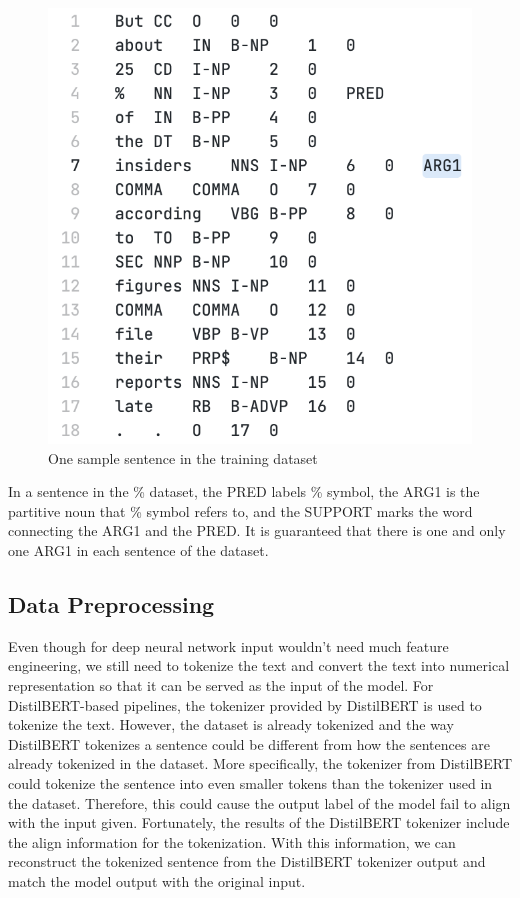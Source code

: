 \documentclass[11pt]{article}
\begin{document}
\begin{figure}[h]
  \centering
  \includegraphics[width=\linewidth]{assets/dataset-one-sample.png}
  \caption{One sample sentence in the training dataset}
  \label{fig:dataset-one-sample}
\end{figure}

In a sentence in the \% dataset, the PRED labels \% symbol, the ARG1 is the partitive noun that \% symbol refers to, and the SUPPORT marks the word connecting the ARG1 and the PRED. It is guaranteed that there is one and only one ARG1 in each sentence of the dataset.

\subsection{Data Preprocessing}
\label{section:data-preprocessing}

Even though for deep neural network input wouldn't need much feature engineering, we still need to tokenize the text and convert the text into numerical representation so that it can be served as the input of the model. For DistilBERT-based pipelines, the tokenizer provided by DistilBERT is used to tokenize the text. However, the dataset is already tokenized and the way DistilBERT tokenizes a sentence could be different from how the sentences are already tokenized in the dataset. More specifically, the tokenizer from DistilBERT could tokenize the sentence into even smaller tokens than the tokenizer used in the dataset. Therefore, this could cause the output label of the model fail to align with the input given. Fortunately, the results of the DistilBERT tokenizer include the align information for the tokenization. With this information, we can reconstruct the tokenized sentence from the DistilBERT tokenizer output and match the model output with the original input.
\end{document}
